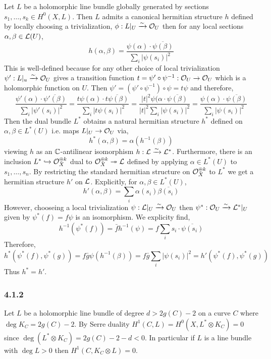 \documentclass[12pt]{article}
\begin{document}
Let $L$ be a holomorphic line bundle globally generated by sections $s_1, \dots, s_k \in H^0(X, L)$. Then $L$ admits a canonical hermitian structure $h$ defined by locally choosing a trivialization, $\phi : L|_U \xrightarrow{\sim} \mathcal{O}_{U}$ then for any local sections $\alpha, \beta \in \mathcal{L}(U)$,
\[ h(\alpha, \beta) = \frac{\psi(\alpha) \cdot \overline{\psi(\beta)}}{\sum_i |\psi(s_i)|^2} \]
This is well-defined because for any other choice of local trivialization $\psi' : L|_u \xrightarrow{\sim} \mathcal{O}_{U}$ gives a transition function $t = \psi' \circ \psi^{-1} : \mathcal{O}_{U} \to \mathcal{O}_{U}$ which is a holomorphic function on $U$. Then $\psi' = (\psi' \circ \psi^{-1}) \circ \psi = t \psi$ and therefore,
\[ \frac{\psi'(\alpha) \cdot \overline{\psi'(\beta)}}{\sum_i |\psi'(s_i)|^2} = \frac{t \psi(\alpha) \cdot \overline{t \psi(\beta)}}{\sum_i |t \psi(s_i)|^2} = \frac{|t|^2 \psi(\alpha \cdot \overline{\psi(\beta)}}{|t|^2 \sum_i |\psi(s_i)|^2} = \frac{\psi(\alpha) \cdot \overline{\psi(\beta)}}{\sum_i |\psi(s_i)|^2} \]
Then the dual bundle $L^*$ obtains a natural hermitian structure $h^*$ defined on $\alpha, \beta \in L^*(U)$ i.e. maps $L|_U \to \mathcal{O}_{U}$ via,
\[ h^*(\alpha, \beta) = \alpha(h^{-1}(\beta)) \]
viewing $h$ as an $\mathbb{C}$-antilinear isomorphism $h : \mathcal{L} \xrightarrow{\sim} \mathcal{L}^*$. Furthermore, there is an inclusion $L^* \hookrightarrow \mathcal{O}_{X}^{\oplus k}$ dual to $\mathcal{O}_{X}^{\oplus k} \twoheadrightarrow \mathcal{L}$ defined by applying $\alpha \in L^*(U)$ to $s_1, \dots, s_n$. By restricting the standard hermitian structure on $\mathcal{O}_{X}^{\oplus k}$ to $L^*$ we get a hermitian structure $h'$ on $\mathcal{L}$. Explicitly, for $\alpha, \beta \in L^*(U)$,
\[ h'(\alpha, \beta) = \sum_i \alpha(s_i) \overline{\beta(s_i)} \]
However, chooseing a local trivialization $\psi : \mathcal{L}|_U \xrightarrow{\sim} \mathcal{O}_{U}$ then $\psi^* : \mathcal{O}_{U} \xrightarrow{\sim} \mathcal{L}^*|_U$ given by $\psi^*(f) = f \psi$ is an isomorphism. We explicity find,
\[ h^{-1}(\psi^*(f)) = \bar{f} h^{-1}(\psi) = f \sum_i s_i \cdot \overline{\psi(s_i)} \]
Therefore, 
\[ h^*(\psi^*(f), \psi^*(g)) = f \bar{g} \psi(h^{-1}(\beta)) = f \bar{g} \sum_i |\psi(s_i)|^2 = h'(\psi^*(f), \psi^*(g)) \]
Thus $h^* = h'$.

\subsubsection{4.1.2}

Let $L$ be a holomorphic line bundle of degree $d > 2 g(C) - 2$ on a curve $C$ where $\deg{K_C} = 2 g(C) - 2$. By Serre duality $H^1(C, L) = H^0(X, L^* \otimes K_C) = 0$ since $\deg{(L^* \otimes K_C)} = 2 g(C) - 2 - d < 0$. In particular if $L$ is a line bundle with $\deg{L} > 0$ then $H^1(C, K_C \otimes L) = 0$.
\end{document}
